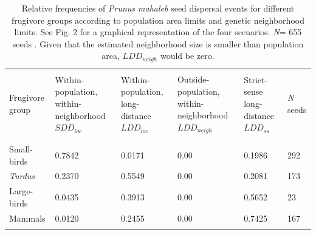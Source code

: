 \documentclass[a4paper, 12pt]{article}
\begin{document}
\pagestyle{empty}
\begin{landscape}
\begin{table}
\captionsetup{width=21cm}%
\caption{Relative frequencies of \textit{Prunus mahaleb} seed dispersal events for different frugivore groups according to population area limits and genetic neighborhood limits. See Fig. 2 for a graphical representation of the four scenarios. \textit{N}= 655 seeds \citep[see Table 1 in ][]{Jordano:2007}. Given that the estimated neighborhood size is smaller than population area, $LDD_{neigh}$ would be zero.}
\vspace{0.5cm}
    \begin{tabular}{lp{3cm}p{3cm}p{3cm}p{3cm}p{3cm}}
    \hline \\
    Frugivore group & Within-population, within-neighborhood $SDD_{loc}$ & Within-population, long-distance $LDD_{loc}$ & Outside-population, within-neighborhood $LDD_{neigh}$ & Strict-sense long-distance $LDD_{ss}$ & \textit{N} seeds  \\\\ \hline \\
	Small-birds	    & 0.7842 &  0.0171 & 0.00 & 0.1986 & 292  \\
	\textit{Turdus} & 0.2370 &  0.5549 & 0.00 & 0.2081 & 173  \\
	Large-birds     & 0.0435 &  0.3913 & 0.00 & 0.5652 &  23  \\
	Mammals         & 0.0120 &  0.2455 & 0.00 & 0.7425 & 167  \\\\
\hline
    \end{tabular}
\end{table}
\end{landscape}

 
\newpage 
 
\end{document}
